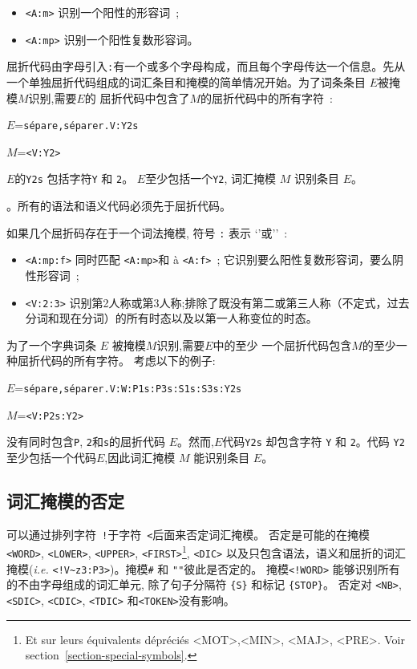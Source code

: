 \begin{itemize}
  \item \verb+<A:m>+ 识别一个阳性的形容词~;
  \item \verb+<A:mp>+ 识别一个阳性复数形容词。
\end{itemize}

\noindent 屈折代码由字母引入\verb+:+有一个或多个字母构成，而且每个字母传达一个信息。先从一个单独屈折代码组成的词汇条目和掩模的简单情况开始。为了词条条目 $E$被掩模$M$识别,需要$E$的
屈折代码中包含了$M$的屈折代码中的所有字符~:

\bigskip
$E$=\verb$sépare,séparer.V:Y2s$

$M$=\verb$<V:Y2>$

\bigskip
\noindent $E$的\verb+Y2s+ 包括字符\verb+Y+ 和 \verb+2+。 $E$至少包括一个\verb+Y2+, 词汇掩模 $M$ 识别条目 $E$。

\bigskip
{}。所有的语法和语义代码必须先于屈折代码。 

\bigskip
\noindent 如果几个屈折码存在于一个词法掩模, 符号 \verb+:+ 表示 `'或''~:

\begin{itemize}
  \item \verb+<A:mp:f>+ 同时匹配 \verb+<A:mp>+和 à \verb+<A:f>+~; 它识别要么阳性复数形容词，要么阴性形容词~;
  \item \verb+<V:2:3>+ 识别第2人称或第3人称;排除了既没有第二或第三人称（不定式，过去分词和现在分词）的所有时态以及以第一人称变位的时态。 
\end{itemize}

\noindent 为了一个字典词条 $E$ 被掩模$M$识别,需要$E$中的至少
一个屈折代码包含$M$的至少一种屈折代码的所有字符。
考虑以下的例子:

\bigskip
$E$=\verb$sépare,séparer.V:W:P1s:P3s:S1s:S3s:Y2s$

$M$=\verb$<V:P2s:Y2>$

\bigskip
\noindent 没有同时包含\verb+P+, \verb+2+和\verb+s+的屈折代码
$E$。然而,$E$代码\verb+Y2s+ 却包含字符 \verb+Y+ 和 \verb+2+。代码 \verb+Y2+ 至少包括一个代码$E$,因此词汇掩模
$M$ 能识别条目 $E$。


\subsection{词汇掩模的否定}
可以通过排列字符~\verb+!+于字符~\verb+<+后面来否定词汇掩模。  否定是可能的在掩模 \verb+<WORD>+, \verb+<LOWER>+,
\verb+<UPPER>+,
\verb+<FIRST>+\footnote{Et sur leurs équivalents dépréciés  <MOT>,<MIN>, <MAJ>,
<PRE>. Voir section~\ref{section-special-symbols}.},
\verb+<DIC>+  以及只包含语法，语义和屈折的词汇掩模(\textit{i.e.} \verb$<!V~z3:P3>$)。掩模\verb+#+ 和 \verb+""+彼此是否定的。 
\index{\verb+#+}
掩模\verb$<!WORD>$ 能够识别所有的不由字母组成的词汇单元, 除了句子分隔符 \verb+{S}+ 和标记 \verb+{STOP}+。
否定对 \verb+<NB>+, \verb+<SDIC>+, \verb+<CDIC>+, \verb+<TDIC>+ 和\verb+<TOKEN>+没有影响。

